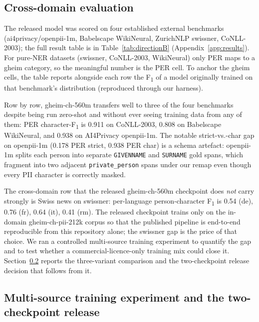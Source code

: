 \documentclass[sigconf,nonacm]{acmart}
\begin{document}
\subsection{Cross-domain evaluation}
\label{sec:crossdomain}

The released model was scored on four established external benchmarks
(\textsf{ai4privacy/openpii-1m}, Babelscape \textsf{WikiNeural},
ZurichNLP \textsf{swissner}, CoNLL-2003); the full result table is
in Table~\ref{tab:directionB}
(Appendix~\ref{app:results}). For pure-NER datasets
(\textsf{swissner}, CoNLL-2003, WikiNeural) only PER maps to a
\textsf{gheim} category, so the meaningful number is the PER cell.
To anchor the gheim cells, the table reports alongside each row the
F\textsubscript{1} of a model originally trained on that benchmark's
distribution (reproduced through our harness).

Row by row, \textsf{gheim-ch-560m} transfers well to three of the
four benchmarks despite being run zero-shot and without ever seeing
training data from any of them: PER character-F\textsubscript{1}
is 0.911 on CoNLL-2003, 0.808 on Babelscape WikiNeural, and 0.938
on AI4Privacy openpii-1m. The notable strict-vs.-char gap on
\textsf{openpii-1m} (0.178 PER strict, 0.938 PER char) is a schema
artefact: openpii-1m splits each person into separate
\texttt{GIVENNAME} and \texttt{SURNAME} gold spans, which fragment
into two adjacent \texttt{private\_person} spans under our remap
even though every PII character is correctly masked.

The cross-domain row that the released \textsf{gheim-ch-560m}
checkpoint does \emph{not} carry strongly is Swiss news on
\textsf{swissner}: per-language person-character F\textsubscript{1}
is 0.54 (de), 0.76 (fr), 0.64 (it), 0.41 (rm). The released
checkpoint trains only on the in-domain
\textsf{gheim-ch-pii-212k} corpus so that the published pipeline
is end-to-end reproducible from this repository alone; the
swissner gap is the price of that choice. We ran a controlled
multi-source training experiment to quantify the gap and to test
whether a commercial-licence-only training mix could close it.
Section~\ref{sec:multisource} reports the three-variant comparison
and the two-checkpoint release decision that follows from it.

\subsection{Multi-source training experiment and the two-checkpoint release}
\label{sec:multisource}
\end{document}
